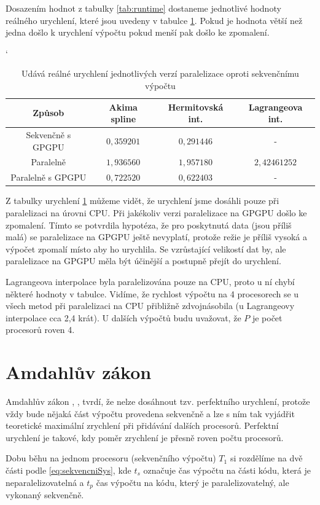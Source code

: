\documentclass{article}
\begin{document}
	\par Dosazením hodnot z tabulky \ref{tab:runtime} dostaneme jednotlivé hodnoty reálného urychlení, které jsou uvedeny v tabulce \ref{tab:zrychleni}. Pokud je hodnota větší než jedna došlo k urychlení výpočtu pokud menší pak došlo ke zpomalení.
	
	\begin{table}[h]
	\centering
	\catcode`
	\def\arraystretch{1.2}
	\begin{tabular}{|c|c|c|c|}
	\hline
	\textbf{Způsob}   & \textbf{Akima spline} & \textbf{Hermitovská int.} &  \textbf{Lagrangeova int.} \\ \hline
	\hline
	Sekvenčně s GPGPU      & $0,359201$                 & $0,291446$               &         -                            \\ \hline
	Paralelně         		  & $1,936560$                  & $1,957180$                      & $2,42461252$       \\ \hline
	Paralelně s GPGPU        & $0,722520$                 & $0,622403$                    &            -              \\ \hline
	\end{tabular}
	\caption{Udává reálné urychlení jednotlivých verzí paralelizace oproti sekvenčnímu výpočtu}
	\label{tab:zrychleni}
	\end{table}
	
	\par Z tabulky urychlení \ref{tab:zrychleni} můžeme vidět, že urychlení jsme dosáhli pouze při paralelizaci na úrovni CPU. Při jakékoliv verzi paralelizace na GPGPU došlo ke zpomalení. Tímto se potvrdila hypotéza, že pro poskytnutá data (jsou příliš malá) se paralelizace na GPGPU ještě nevyplatí, protože režie je příliš vysoká a výpočet zpomalí místo aby ho urychlila. Se vzrůstající velikostí dat by, ale paralelizace na GPGPU měla být účinější a postupně přejít do urychlení.
	\par Lagrangeova interpolace byla paralelizována pouze na CPU, proto u ní chybí některé hodnoty v tabulce. Vidíme, že rychlost výpočtu na 4 procesorech se u všech metod při paralelizaci na CPU přibližně zdvojnásobila (u Lagrangeovy interpolace cca 2,4 krát). U dalších výpočtů budu uvažovat, že $P$ je počet procesorů roven 4.
	
	\section{Amdahlův zákon}
	Amdahlův zákon \cite{lit:amdahl}, \cite{lit:amdahlHomel}, \cite{lit:amdahlKout} tvrdí, že nelze dosáhnout tzv. perfektního urychlení, protože vždy bude nějaká část výpočtu provedena sekvenčně a lze s ním tak vyjádřit teoretické maximální zrychlení při přidávání dalších procesorů. Perfektní urychlení je takové, kdy poměr zrychlení je přesně roven počtu procesorů.
	\par Dobu běhu na jednom procesoru (sekvenčního výpočtu) $T_{1}$ si rozdělíme na dvě části podle \ref{eq:sekvencniSys}, kde $t_{s}$ označuje čas výpočtu na části kódu, která je neparalelizovatelná a $ t_{p}$ čas výpočtu na kódu, který je paralelizovatelný, ale vykonaný sekvenčně. 
	
\end{document}
